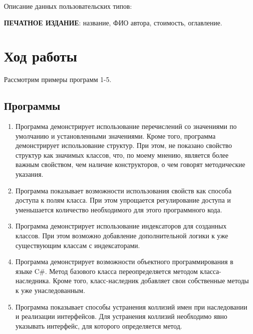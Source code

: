 \documentclass[a4paper,14pt]{extarticle}
\begin{document}
    Описание данных пользовательских типов:

    \textbf{ПЕЧАТНОЕ ИЗДАНИЕ}: название, ФИО автора, стоимость, оглавление.
    
    \section{Ход работы}
    Рассмотрим примеры программ 1-5.
    \subsection{Программы}
    \begin{enumerate}
        \item Программа демонстрирует использование перечислений со значениями по умолчанию
              и установленными значениями. Кроме того, программа демонстрирует использование
              структур. При этом, не показано свойство структур как значимых классов, что, по
              моему мнению, является более важным свойством, чем наличие конструкторов, о чем
              говорят методические указания.
        \item Программа показывает возможности использования свойств как способа доступа к полям
              класса. При этом упрощается регулирование доступа и уменьшается количество 
              необходимого для этого программного кода.
        \item Программа демонстрирует использование индексаторов для созданных классов. При этом
              возможно добавление дополнительной логики к уже существующим классам с индексаторами.
        \item Программа демонстрирует возможности объектного программирования в языке C\#. Метод
              базового класса переопределяется методом класса-наследника. Кроме того, класс-наследник
              добавляет свои собственные методы к уже унаследованным.
        \item Программа показывает способы устранения коллизий имен при наследовании и реализации
              интерфейсов. Для устранения коллизий необходимо явно указывать интерфейс, для которого
              определяется метод.
    \end{enumerate}
    
\end{document}
